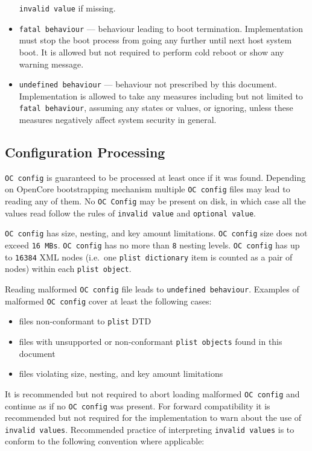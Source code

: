 \documentclass[]{article}
\makeatletter
\providecommand{\tightlist}{%
  \setlength{\itemsep}{0pt}\setlength{\parskip}{0pt}}
\renewcommand{\label}[1]{%
\zref@wrapper@immediate{\oldlabel{#1}}}  %
\makeatother
\begin{document}
\begin{itemize}
  \texttt{invalid\ value} if missing.
\item
  \texttt{fatal\ behaviour} --- behaviour leading to boot termination.
  Implementation must stop the boot process from going any further until
  next host system boot. It is allowed but not required to perform cold
  reboot or show any warning message.
\item
  \texttt{undefined\ behaviour} --- behaviour not prescribed by this
  document. Implementation is allowed to take any measures including but
  not limited to \texttt{fatal\ behaviour}, assuming any states or
  values, or ignoring, unless these measures negatively affect system
  security in general.
\end{itemize}

\subsection{Configuration Processing}\label{configuration-processing}

\texttt{OC\ config} is guaranteed to be processed at least once if it
was found. Depending on OpenCore bootstrapping mechanism multiple
\texttt{OC\ config} files may lead to reading any of them. No
\texttt{OC\ Config} may be present on disk, in which case all the values
read follow the rules of \texttt{invalid\ value} and
\texttt{optional\ value}.

\texttt{OC\ config} has size, nesting, and key amount limitations.
\texttt{OC\ config} size does not exceed \texttt{16\ MBs}.
\texttt{OC\ config} has no more than \texttt{8} nesting levels.
\texttt{OC\ config} has up to \texttt{16384} XML nodes (i.e.~one
\texttt{plist\ dictionary} item is counted as a pair of nodes) within
each \texttt{plist\ object}.

Reading malformed \texttt{OC\ config} file leads to
\texttt{undefined\ behaviour}. Examples of malformed \texttt{OC\ config}
cover at least the following cases:

\begin{itemize}
\tightlist
\item
  files non-conformant to \texttt{plist} DTD
\item
  files with unsupported or non-conformant \texttt{plist\ objects} found
  in this document
\item
  files violating size, nesting, and key amount limitations
\end{itemize}

It is recommended but not required to abort loading malformed
\texttt{OC\ config} and continue as if no \texttt{OC\ config} was
present. For forward compatibility it is recommended but not required
for the implementation to warn about the use of
\texttt{invalid\ values}. Recommended practice of interpreting
\texttt{invalid\ values} is to conform to the following convention where
applicable:
\end{document}
